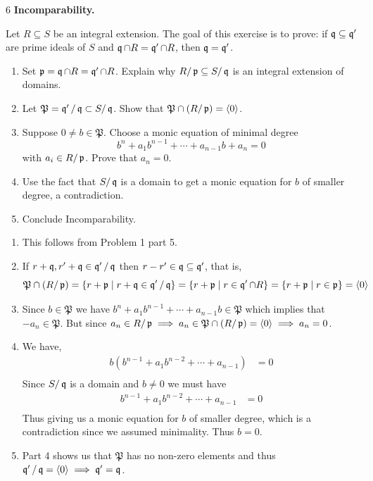 \documentclass[Notebook.tex]{subfiles}
\begin{document}
\begin{problem}{6} \textbf{Incomparability.} 
    
    Let $R\subseteq S$ be an integral extension. The goal of this exercise is to prove: if $\operatorname{\mathfrak{q}}\subseteq \operatorname{\mathfrak{q}}'$ are prime ideals of $S$ and $\operatorname{\mathfrak{q}}\cap R=\operatorname{\mathfrak{q}}'\cap R$, then $\operatorname{\mathfrak{q}}=\operatorname{\mathfrak{q}}'$.
    \begin{enumerate}
        \item Set $\operatorname{\mathfrak{p}}=\operatorname{\mathfrak{q}}\cap R=\operatorname{\mathfrak{q}}'\cap R$. Explain why $R/\operatorname{\mathfrak{p}}\subseteq S/\operatorname{\mathfrak{q}}$ is an integral extension of domains.
        \item Let $\mathfrak P=\operatorname{\mathfrak{q}}'/\operatorname{\mathfrak{q}}\subset S/\operatorname{\mathfrak{q}}$. Show that $\mathfrak P\cap (R/\operatorname{\mathfrak{p}})=\langle 0\rangle$.
        \item Suppose $0\neq b\in \mathfrak P$. Choose a monic equation of minimal degree
        \[
        b^n+a_1b^{n-1}+\cdots+a_{n-1}b+a_n=0
        \]
        with $a_i\in R/\operatorname{\mathfrak{p}}$. Prove that $a_n=0$.
        \item Use the fact that $S/\operatorname{\mathfrak{q}}$ is a domain to get a monic equation for $b$ of smaller degree, a contradiction.
        \item Conclude Incomparability.
    \end{enumerate}
\end{problem}

\begin{solution}
    \bbni
    \begin{enumerate}
        \item This follows from Problem 1 part 5. 
        \item If $r + \operatorname{\mathfrak{q}}, r' + \operatorname{\mathfrak{q}} \in \operatorname{\mathfrak{q}}'/\operatorname{\mathfrak{q}}$ then $r - r' \in \operatorname{\mathfrak{q}} \subseteq \operatorname{\mathfrak{q}}'$, that is, 
        \[\mathfrak{P} \cap (R/\operatorname{\mathfrak{p}}) = \{r + \operatorname{\mathfrak{p}}  \mid r + \operatorname{\mathfrak{q}} \in \operatorname{\mathfrak{q}}'/\operatorname{\mathfrak{q}} \} = \{r + \operatorname{\mathfrak{p}} \mid r \in \operatorname{\mathfrak{q}}' \cap R\} = \{r + \operatorname{\mathfrak{p}} \mid r \in \operatorname{\mathfrak{p}}\} = \langle 0 \rangle\]
        \item Since $b \in \mathfrak{P}$ we have $b^n+a_1b^{n-1}+\cdots+a_{n-1}b \in \mathfrak{P}$ which implies that $-a_n \in \mathfrak{P}$. But since $a_n \in R/\operatorname{\mathfrak{p}} \implies a_n \in \mathfrak{P} \cap (R/\operatorname{\mathfrak{p}}) = \langle 0 \rangle \implies a_n = 0$. 
        \item  We have, 
        \begin{align*}
             b(b^{n-1}+a_1b^{n-2}+\cdots+a_{n-1})&=0 \\ 
        \end{align*}
        Since $S/\operatorname{\mathfrak{q}}$ is a domain and $b \neq 0$ we must have
        \begin{align*}
             b^{n-1}+a_1b^{n-2}+\cdots+a_{n-1} &=0 \\ 
        \end{align*} 
        Thus giving us a monic equation for $b$ of smaller degree, which is a contradiction since we assumed minimality. Thus $b = 0$. 
        \item Part 4 shows us that $\mathfrak{P}$ has no non-zero elements and thus $\operatorname{\mathfrak{q}}' / \operatorname{\mathfrak{q}} = \langle 0 \rangle \implies \operatorname{\mathfrak{q}}' = \operatorname{\mathfrak{q}}$. 
    \end{enumerate}
\end{solution}
\end{document}
